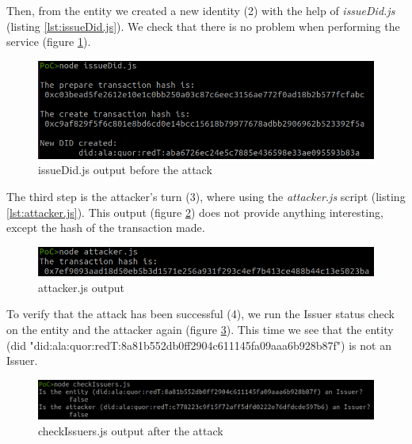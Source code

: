 \documentclass[a4paper, 12pt]{article} %
\begin{document}
        Then, from the entity we created a new identity (2) with the help of \textit{issueDid.js} (listing \ref{lst:issueDid.js}). We check that there is no problem when performing the service (figure \ref{fig:poc-2}).\\
        \begin{figure}[h]
            \centering
            \includegraphics[width=1.0\textwidth]{poc/2.png}
            \caption{issueDid.js output before the attack}
            \label{fig:poc-2}
        \end{figure}
        
        The third step is the attacker's turn (3), where using the \textit{attacker.js} script (listing \ref{lst:attacker.js}). This output (figure \ref{fig:poc-3}) does not provide anything interesting, except the hash of the transaction made.\\
        \begin{figure}[h]
            \centering
            \includegraphics[width=1.0\textwidth]{poc/3.png}
            \caption{attacker.js output}
            \label{fig:poc-3}
        \end{figure}
        
        To verify that the attack has been successful (4), we run the Issuer status check on the entity and the attacker again (figure \ref{fig:poc-4}). This time we see that the entity (\acrshort{did} "did:ala:quor:redT:8a81b552db0ff2904c611145fa09aaa6b928b87f") is not an Issuer.\\
        \begin{figure}[h]
            \centering
            \includegraphics[width=1.0\textwidth]{poc/4.png}
            \caption{checkIssuers.js output after the attack}
            \label{fig:poc-4}
        \end{figure}
        
\end{document}
